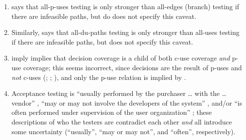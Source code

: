 \begin{enumerate}
          All-\acsp{du-path} testing is usually defined as exercising all
          ``loop-free control flow sub-paths from each variable definition to
          every use (both \acs{p-use} and \acs{c-use}) of that definition (with no
          intervening definitions)'' (\citealp[p.~29]{IEEE2021c}; similar in
          \citeyear[p.~125]{IEEE2017}; \citealp[p.~5\=/13]{SWEBOK2024};
          \citealp[p.~479]{PetersAndPedrycz2000}); however, paths containing
          simple cycles may also be required \citep[p.~425]{vanVliet2000}.
    \item %
           says that
          all-\acsp{p-use} testing is only stronger than all-edges (branch)
          testing if there are infeasible paths, but
          \citet[Fig.~F.1]{IEEE2021c} \ifnotpaper do
          \else does \fi not specify this caveat.
    \item %
          Similarly, \citet[pp.~432\==433]{vanVliet2000} says that
          all-\acsp{du-path} testing is only stronger than all-uses testing if
          there are infeasible paths, but \citet[p.~5\=/13]{SWEBOK2024} does
          not specify this caveat.
    \item %
          \citet[Fig.~12.31]{PetersAndPedrycz2000} \ifnotpaper imply
          \else implies \fi that decision coverage is a child of both \acs{c-use}
          coverage \emph{and} \acs{p-use} coverage; this seems incorrect, since
          decisions are the result of \acsp{p-use} and \emph{not} \acsp{c-use}
          (\citealp[pp.~5, 27]{IEEE2021c}; \citeyear[p.~332]{IEEE2017};
          \citealp[p.~424]{vanVliet2000}), and only the \acs{p-use} relation is
          implied by \citet[Fig.~F.1]{IEEE2021c}.
    \item %
          Acceptance testing is ``usually performed by the purchaser \dots{}
          with the \dots{} vendor'' \citep[p.~5]{IEEE2017}, ``may or may not
          involve the developers of the system'' \citep[p.~4\=/6]{SWEBOK2014},
          and/or ``is often performed under supervision of the user
          organization'' \citep[p.~439]{vanVliet2000}; these descriptions
          of who the testers are contradict each other \emph{and} all introduce
          some uncertainty
          (``usually'', ``may or may not'', and ``often'', respectively).


\end{enumerate}
